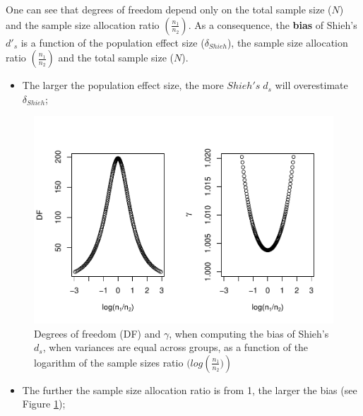 \documentclass[
  man]{apa6}
\providecommand{\tightlist}{%
  \setlength{\itemsep}{0pt}\setlength{\parskip}{0pt}}
\begin{document}
One can see that degrees of freedom depend only on the total sample size (\(N\)) and the sample size allocation ratio \(\left( \frac{n_1}{n_2}\right)\). As a consequence, the \textbf{bias} of Shieh's \(d'_s\) is a function of the population effect size (\(\delta_{Shieh}\)), the sample size allocation ratio \(\left( \frac{n_1}{n_2}\right)\) and the total sample size (\(N\)).

\begin{itemize}
\tightlist
\item
  The larger the population effect size, the more \(Shieh's \; d_s\) will overestimate \(\delta_{Shieh}\);
\end{itemize}

\begin{figure}
\centering
\includegraphics{Theoretical-Bias-of-all-estimators-as-a-function-of-population-parameters_files/figure-latex/biasshiehhomNratio2-1.pdf}
\caption{\label{fig:biasshiehhomNratio2}Degrees of freedom (DF) and \(\gamma\), when computing the bias of Shieh's \(d_s\), when variances are equal across groups, as a function of the logarithm of the sample sizes ratio \((log \left(\frac{n_1}{n_2})\right)\)}
\end{figure}

\begin{itemize}
\tightlist
\item
  The further the sample size allocation ratio is from 1, the larger the bias (see Figure \ref{fig:biasshiehhomNratio2});
\end{itemize}
\end{document}
